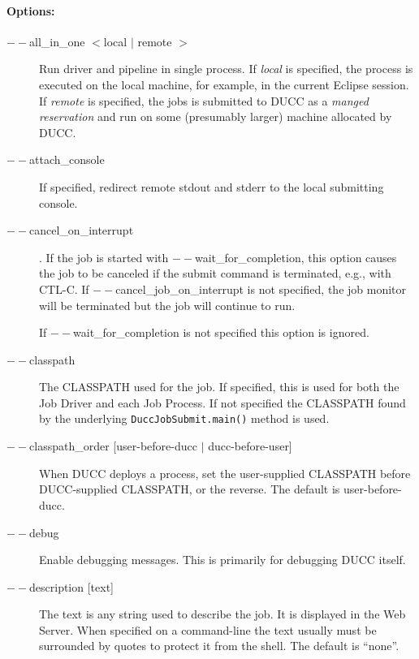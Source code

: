         \paragraph{Options:}
           \begin{description}

           \item[$--$all\_in\_one $<$local $|$ remote $>$]
               Run driver and pipeline in single process.  If {\em local} is specified, the
               process is executed on the local machine, for example, in the current Eclipse session.
               If {\em remote} is specified, the jobs is submitted to DUCC as a {\em manged reservation}
               and run on some (presumably larger) machine allocated by DUCC.

           \item[$--$attach\_console] If specified, redirect remote stdout and stderr
             to the local submitting console.

           \item[$--$cancel\_on\_interrupt].  If the job is started with $--$wait\_for\_completion, this
             option causes the job to be canceled if the submit command is terminated,
             e.g., with CTL-C. If $--$cancel\_job\_on\_interrupt is not
             specified, the job monitor will be terminated but the job will continue to run.

             If $--$wait\_for\_completion is not specified this option is ignored. 

           \item[$--$classpath] The CLASSPATH used for the job.  If specified, this is used
             for both the Job Driver and each Job Process. If not specified the CLASSPATH found by the underlying
             {\tt DuccJobSubmit.main()} method is used.

           \item[$--$classpath\_order {[user-before-ducc $|$ ducc-before-user]} ]
             When DUCC deploys a process, set the user-supplied CLASSPATH before DUCC-supplied
             CLASSPATH, or the reverse. The default is user-before-ducc.
             
           \item[$--$debug] Enable debugging messages. This is primarily for debugging DUCC itself.

           \item[$--$description {[text]}] The text is any string used to describe the job. It is
             displayed in the Web Server. When specified on a command-line the text usually 
             must be surrounded by quotes to protect it from the shell.  The default is ``none''.


\end{description}
